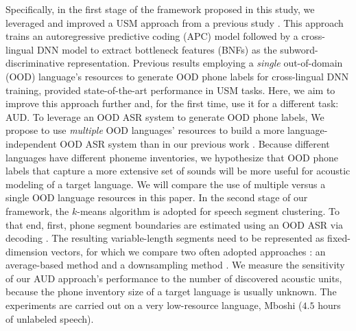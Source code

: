 \documentclass[a4paper]{article}
\begin{document}
Specifically, in the first stage of the framework proposed in this study, we leveraged and improved a USM approach from a previous study \cite{feng2020unsupervised}. This approach trains an autoregressive predictive coding (APC)  model \cite{Chung2019} followed by a cross-lingual DNN model to  extract bottleneck features  (BNFs)  as the   subword-discriminative representation. 
Previous results  \cite{feng2020unsupervised,feng2020effectiveness} employing a \textit{single} out-of-domain (OOD) language's resources to generate OOD phone labels for cross-lingual DNN training,  provided state-of-the-art performance in USM tasks. 
Here, we aim to improve this approach further and, for the first time, use it for a different task: AUD. 
To leverage an OOD ASR system to generate OOD phone labels, We propose to use \textit{multiple} OOD languages' resources to build a more language-independent OOD ASR system than in our previous work \cite{feng2020unsupervised}. 
Because different languages have different phoneme inventories, we hypothesize that OOD phone labels that capture a more extensive set of sounds will be more useful for acoustic modeling of a target language. We will compare the use of multiple versus a single OOD language resources in this paper.
In the second stage of our framework,  the $k$-means algorithm is adopted for speech segment clustering. To that end, first, phone segment boundaries are estimated using an OOD ASR via decoding \cite{feng2016exploit}. The resulting variable-length segments need to be represented as fixed-dimension vectors, 
for which we compare two often adopted approaches \cite{kamper2017embeded,Bhati2019unsupervised,feng2016exploit}: an average-based method \cite{I3EWang} and a downsampling method \cite{levin2013fixed}.  
We measure the sensitivity of our AUD approach's performance to   the number of discovered acoustic units,
because the phone inventory size of a target language is usually unknown. 
The experiments   are carried out   on a very low-resource language, Mboshi  \cite{Godard2018mboshi} ($4.5$ hours of unlabeled speech).
\end{document}
